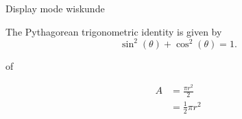 \begin{frame}[fragile]{Display mode wiskunde}
    
\begin{tcolorbox}[width=11cm, size=small]
        The Pythagorean trigonometric identity is given by
        \begin{equation} \sin^2(\theta) + \cos^2(\theta) = 1. \end{equation}
\end{tcolorbox}
\begin{center}
    of
\end{center}
\begin{tcolorbox}[width=11cm, size=small]
    \begin{equation*}
        \begin{split}
        A & = \frac{\pi r^2}{2} \\
         & = \frac{1}{2} \pi r^2
        \end{split}
    \end{equation*}
\end{tcolorbox}

\end{frame}